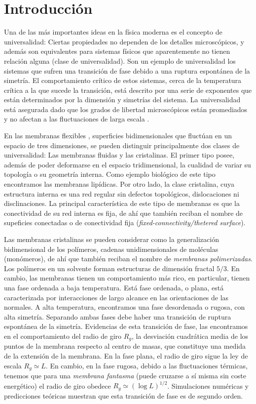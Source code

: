 \chapter{Introducción}

Una de las más importantes ideas en la física moderna es el concepto de
universalidad: Ciertas propiedades no dependen de los
detalles microscópicos, y además son equivalentes para sistemas
físicos que aparentemente no tienen relación alguna (clase de universalidad). Son un ejemplo de universalidad los sistemas que sufren una transición de fase debido a una ruptura
espontánea de la simetría. El comportamiento crítico de estos sistemas, cerca
de la temperatura crítica a la que sucede la transición, está descrito por una
serie de exponentes que están determinados por la dimensión y simetrías del
sistema. La universalidad está asegurada dado que los grados de libertad
microscópicos están promediados y no afectan a las fluctuaciones de larga
escala \cite{Kay:Polimerized_Membranes}. 

En las membranas flexibles \cite{Bowick_flat_phase}, superficies bidimensionales que fluctúan en un
espacio de tres dimensiones, se pueden distinguir principalmente dos clases de
universalidad: Las membranas fluidas y las cristalinas. El primer tipo posee, además de poder
deformarse en el espacio tridimensional, la cualidad de variar su topología o
su geometría interna. Como ejemplo biológico de este tipo encontramos las
membranas lipídicas. Por otro lado, la clase cristalina, cuya estructura
interna es una red regular sin defectos topológicos, dislocaciones ni disclinaciones.  
 La principal característica de este tipo de membranas es que la conectividad
de su red interna es fija, de ahí que también reciban el nombre de supeficies
conectadas o de conectividad fija (\textit{fixed-connectivity/thetered surface}).  

Las membranas cristalinas se pueden considerar como la
generalización bidimensional de los polímeros, cadenas unidimensionales
de moléculas (monómeros), de ahí que también reciban el nombre de
\textit{membranas polimerizadas}. Los polímeros en un solvente forman
estructuras de dimensión fractal $5/3$. En cambio, las membranas tienen un
comportamiento más rico, en particular, tienen una fase ordenada a baja
temperatura. Está fase ordenada, o plana, está caracterizada por interacciones
de largo alcance en las orientaciones de las normales. A alta temperatura,
encontramos una fase desordenada o rugosa, con alta simetría. Separando ambas fases debe haber
una transición de ruptura espontánea de la simetría. Evidencias de esta
transición de fase, las encontramos en el comportamiento del radio de giro
$R_g$, la desviación cuadrática media de los puntos de la membrana respecto
al centro de masas, que constituye una medida de la extensión de la membrana. En la fase
plana, el radio de giro sigue la ley de escala $R_g\simeq L$. En cambio,
en la fase rugosa, debido a las fluctuaciones térmicas, tenemos que para una \textit{membrana
fantasma} (puede cruzarse a sí misma sin coste energético) el radio de giro
obedece $R_g\simeq (\log L)^{1/2}$. Simulaciones numéricas \cite{Bowick_flat_phase}\cite{Espriu:MCRG}
y predicciones teóricas \cite{Doussal:nu} muestran que esta transición de fase es de segundo orden.

